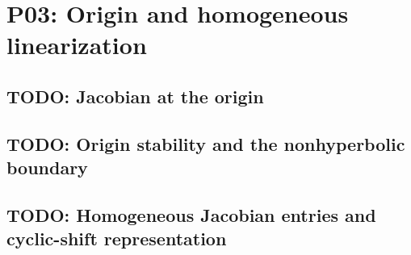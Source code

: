 
\section{P03: Origin and homogeneous linearization}
\label{sec:P03}

\subsection{TODO: Jacobian at the origin}
\label{slot:P03-1}

\subsection{TODO: Origin stability and the nonhyperbolic boundary}
\label{slot:P03-2}

\subsection{TODO: Homogeneous Jacobian entries and cyclic-shift representation}
\label{slot:P03-3}
